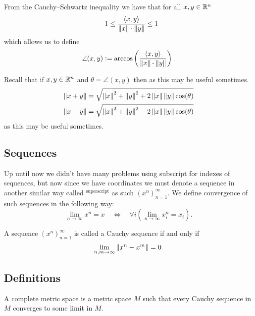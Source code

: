 \documentclass[11pt,a4paper]{article}
\begin{document}
\begin{definition}
  From the Cauchy--Schwartz inequality we have that for all $x,y \in \mathbb{R}^n$
  \[
    -1 \le \frac{\left\langle x, y \right\rangle}{\left\lVert x\right\rVert \cdot \left\lVert y\right\rVert} \le 1
  \]
  which allows us to define
  \[
    \angle(x,y) := \arccos\del{\frac{\ip{x}{y}}{\norm{x} \cdot \norm{y}}}.
  \]
\end{definition}

\begin{remark}
  Recall that if $x,y \in \mathbb{R}^n$ and $\theta = \angle(x,y)$
  then
  as this may be useful sometimes.
  \begin{gather*}
    \left\lVert x + y\right\rVert = \sqrt{\left\lVert x\right\rVert^2 + \left\lVert y\right\rVert^2 + 2\left\lVert x\right\rVert\left\lVert y\right\rVert \cos(\theta)} \\
    \left\lVert x - y\right\rVert = \sqrt{\left\lVert x\right\rVert^2 + \left\lVert y\right\rVert^2 - 2\left\lVert x\right\rVert\left\lVert y\right\rVert \cos(\theta)}
  \end{gather*}
  as this may be useful sometimes.
\end{remark}

\subsection{Sequences}

\begin{definition}[Convergence]
  Up until now we didn't have many problems using subscript for indexes
  of sequences, but now since we have coordinates we must denote a sequence
  in another similar way called $^{\text{superscript}}$ as such 
  $(x^n)_{n=1}^{\infty}$.
  We define convergence of such sequences in the following way:
  \[
    \lim_{n\to\infty}{x^n} = x 
    \quad \iff \quad
    \forall i\left(\lim_{n\to\infty}{x_i^n} = x_i\right).
  \]
\end{definition}

\begin{definition}
  A sequence $(x^n)_{n=1}^{\infty}$ is called a Cauchy sequence if and only 
  if
  \[
    \lim_{n,m \to \infty}{\left\lVert x^n - x^m\right\rVert} = 0.
  \]
\end{definition}

\subsection{Definitions}
\begin{definition}
  A complete metric space is a metric space $M$ such that every
  Cauchy sequence in $M$ converges to some limit in $M$.
\end{definition}
\end{document}
